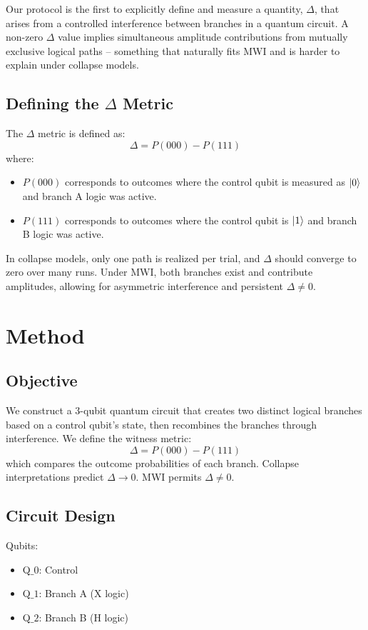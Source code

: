 \documentclass[12pt]{article}
\begin{document}
Our protocol is the first to explicitly define and measure a quantity, $\Delta$, that arises from a controlled interference between branches in a quantum circuit. A non-zero $\Delta$ value implies simultaneous amplitude contributions from mutually exclusive logical paths -- something that naturally fits MWI and is harder to explain under collapse models.

\subsection{Defining the $\Delta$ Metric}

The $\Delta$ metric is defined as:
\[
\Delta = P(000) - P(111)
\]
where:
\begin{itemize}
  \item $P(000)$ corresponds to outcomes where the control qubit is measured as $\ket{0}$ and branch A logic was active.
  \item $P(111)$ corresponds to outcomes where the control qubit is $\ket{1}$ and branch B logic was active.
\end{itemize}

In collapse models, only one path is realized per trial, and $\Delta$ should converge to zero over many runs. Under MWI, both branches exist and contribute amplitudes, allowing for asymmetric interference and persistent $\Delta \neq 0$.

\section{Method}

\subsection{Objective}
We construct a 3-qubit quantum circuit that creates two distinct logical branches based on a control qubit’s state, then recombines the branches through interference. We define the witness metric:
\[
\Delta = P(000) - P(111)
\]
which compares the outcome probabilities of each branch. Collapse interpretations predict $\Delta \rightarrow 0$. MWI permits $\Delta \neq 0$.

\subsection{Circuit Design}

Qubits:
\begin{itemize}
\item Q$\_0$: Control
\item Q$\_1$: Branch A (X logic)
\item Q$\_2$: Branch B (H logic)
\end{itemize}
\end{document}
